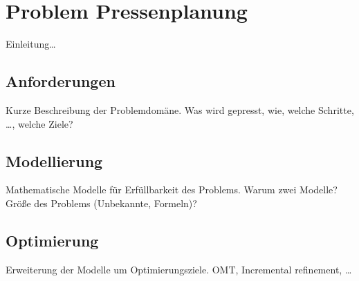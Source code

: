 \chapter{Problem Pressenplanung}
Einleitung\ldots

\section{Anforderungen}
Kurze Beschreibung der Problemdomäne.
Was wird gepresst, wie, welche Schritte, \ldots, welche Ziele?

\section{Modellierung}
Mathematische Modelle für Erfüllbarkeit des Problems.
Warum zwei Modelle?
Größe des Problems (Unbekannte, Formeln)?

\section{Optimierung}
Erweiterung der Modelle um Optimierungsziele.
OMT, Incremental refinement, \ldots
